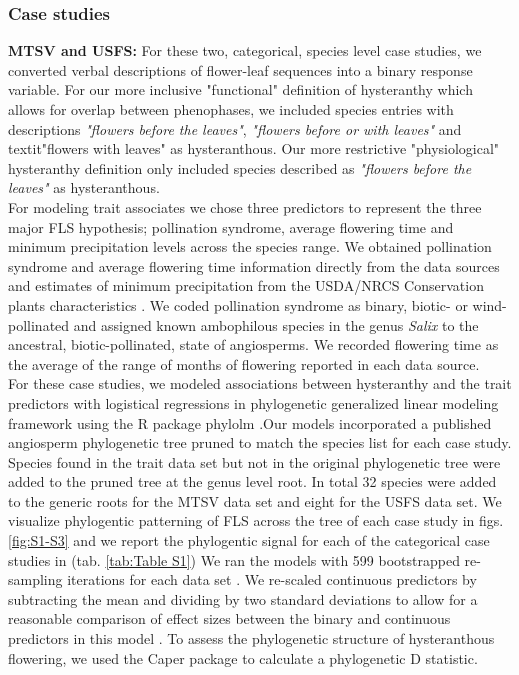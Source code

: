 \documentclass[12pt]{article}\usepackage[]{graphicx}\usepackage[]{color}
\begin{document}
\subsubsection*{Case studies}
\indent\indent \textbf{MTSV and USFS:} For these two, categorical, species level case studies, we converted verbal descriptions of flower-leaf sequences into a binary response variable. For our more inclusive "functional" definition of hysteranthy which allows for overlap between phenophases, we included species entries with descriptions \textit{"flowers before the leaves"}, \textit{"flowers before or with leaves"} and textit{"flowers with leaves"} as hysteranthous. Our more restrictive "physiological" hysteranthy definition only included species described as \textit{"flowers before the leaves"} as hysteranthous.\\
\ident For modeling trait associates we chose three predictors to represent the three major FLS hypothesis; pollination syndrome, average flowering time and minimum precipitation levels across the species range. We obtained pollination syndrome and average flowering time information directly from the data sources and estimates of minimum precipitation from the USDA/NRCS Conservation plants characteristics \citep{USDA}. We coded pollination syndrome as binary, biotic- or wind-pollinated and assigned known ambophilous species in the genus \textit{Salix} to the ancestral, biotic-pollinated, state of angiosperms. We recorded flowering time as the average of the range of months of flowering reported in each data source.\\
\indent For these case studies, we modeled associations between hysteranthy and the trait predictors with logistical regressions in phylogenetic generalized linear modeling framework \citep{Ives2010} using the R package phylolm \citep{Ho2014}.Our models incorporated a published angiosperm phylogenetic tree \citep{Zanne2013} pruned to match the species list for each case study. Species found in the trait data set but not in the original phylogenetic tree were added to the pruned tree at the genus level root. In total 32 species were added to the generic roots for the MTSV data set and eight for the USFS data set. We visualize phylogentic patterning of FLS across the tree of each case study in figs. \ref{fig:S1-S3} and we report the phylogentic signal for each of the categorical case studies in (tab. \ref{tab:Table S1})
We ran the models with 599 bootstrapped re-sampling iterations for each data set \citep{Wilcox2000}. We re-scaled continuous predictors by subtracting the mean and dividing by two standard deviations to allow for a reasonable comparison of effect sizes between the binary and continuous predictors in this model \citep{Gelman2007}. To assess the phylogenetic structure of hysteranthous flowering, we used the Caper package \citep{Orme2013} to calculate a phylogenetic D statistic.\\
\end{document}
